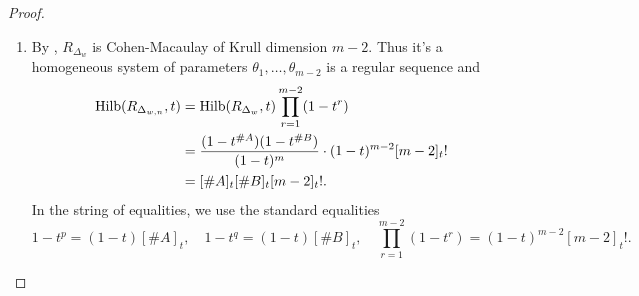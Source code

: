 \begin{proof}
    \begin{enumerate}
        \item By , $R_{\Delta_w}$ is Cohen-Macaulay of Krull dimension $m - 2.$ 
        Thus it's a homogeneous system of parameters $\theta_1,\ldots,\theta_{m-2}$ is a regular sequence and 
        \begin{align*}
            \mathrm{Hilb}(R_{\Delta_{w,n}},t) 
                & = \mathrm{Hilb}(R_{\Delta_{w}},t)\prod_{r=1}^{m-2}(1-t^r) \\
                & = \frac{(1-t^{\#A})(1-t^{\#B})}{(1-t)^m}\cdot(1-t)^{m-2}[m-2]_t! \\
                & = [\#A]_t[\#B]_t[m-2]_t!.
        \end{align*}
        In the string of equalities, we use the standard equalities
        \[
        1-t^p = (1-t)[\#A]_t,
        \quad
        1-t^q = (1-t)[\#B]_t,
        \quad
        \prod_{r=1}^{m-2}(1-t^r) = (1-t)^{m-2}[m-2]_t!.
        \]
        

\end{enumerate}
\end{proof}
